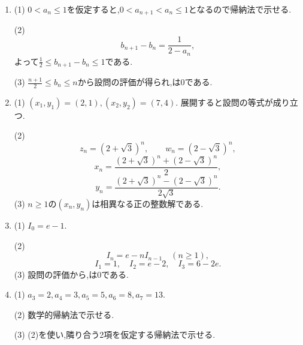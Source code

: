 \begin{enumerate}[label=\textbf{問\arabic*.},leftmargin=3.8em,format=\bookitemlink{practice-bridge}{answer}{solution}]
\[\begin{cases}
        y_{n+1}=\frac14x_n+\frac34y_n.
      \end{cases}
    \]
    (2) $s_n=x_n+y_n,d_n=x_n-y_n$とおくと,
    \[
      s_{n+1}=s_n,\qquad d_{n+1}=\frac12d_n.
    \]
    $s_0=d_0=10$より,
    \[
      x_n=5+\frac5{2^n},\qquad
      y_n=5-\frac5{2^n}.
    \]
    (3) はともに$5$（単位$\mathrm{g}$）である.
  \item (1) $0<a_n\le1$を仮定すると,$0<a_{n+1}<a_n\le1$となるので帰納法で示せる.
    \par\smallskip\noindent
    (2)
    \[
      b_{n+1}-b_n=\frac1{2-a_n},
    \]
    よって$\frac12\le b_{n+1}-b_n\le1$である.
    \par\smallskip\noindent
    (3) $\frac{n+1}{2}\le b_n\le n$から設問の評価が得られ,は$0$である.
  \item (1) $(x_1,y_1)=(2,1),(x_2,y_2)=(7,4)$.
    展開すると設問の等式が成り立つ.
    \par\smallskip\noindent
    (2)
    \[
      z_n=(2+\sqrt3)^n,\qquad w_n=(2-\sqrt3)^n,
    \]
    \[
      x_n=\frac{(2+\sqrt3)^n+(2-\sqrt3)^n}{2},
    \]
    \[
      y_n=\frac{(2+\sqrt3)^n-(2-\sqrt3)^n}{2\sqrt3}.
    \]
    (3) $n\ge1$の$(x_n,y_n)$は相異なる正の整数解である.
  \item (1) $I_0=e-1$.
    \par\smallskip\noindent
    (2)
    \[
      I_n=e-nI_{n-1}\quad(n\ge1),
    \]
    \[
      I_1=1,\quad I_2=e-2,\quad I_3=6-2e.
    \]
    (3) 設問の評価から,は$0$である.
  \item (1) $a_3=2,a_4=3,a_5=5,a_6=8,a_7=13$.
    \par\smallskip\noindent
    (2) 数学的帰納法で示せる.
    \par\smallskip\noindent
    (3) (2)を使い,隣り合う2項を仮定する帰納法で示せる.
\end{enumerate}

